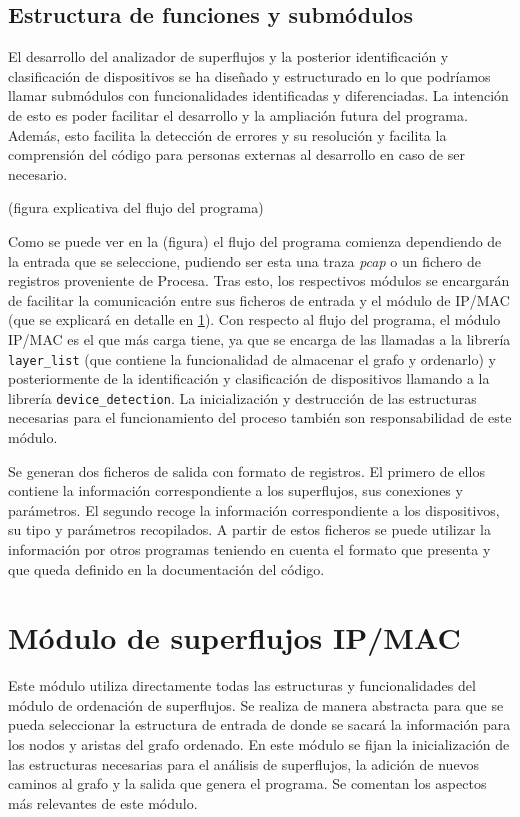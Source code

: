 \documentclass[twoside, 12pt]{epstfg}
\begin{document}
\subsection{Estructura de funciones y submódulos}
\label{subsec:Desarrollo:Ordenacion:EstructuraFunciones}
El desarrollo del analizador de superflujos y la posterior identificación y clasificación de dispositivos se ha diseñado y estructurado en lo que podríamos llamar submódulos con funcionalidades identificadas y diferenciadas. La intención de esto es poder facilitar el desarrollo y la ampliación futura del programa. Además, esto facilita la detección de errores y su resolución y facilita la comprensión del código para personas externas al desarrollo en caso de ser necesario.

(figura explicativa del flujo del programa)

Como se puede ver en la (figura) el flujo del programa comienza dependiendo de la entrada que se seleccione, pudiendo ser esta una traza \textit{pcap} o un fichero de registros proveniente de Procesa. Tras esto, los respectivos módulos se encargarán de facilitar la comunicación entre sus ficheros de entrada y el módulo de IP/MAC (que se explicará en detalle en \ref{sec:Desarrollo:IPMAC}). Con respecto al flujo del programa, el módulo IP/MAC es el que más carga tiene, ya que se encarga de las llamadas a la librería \texttt{layer\_list} (que contiene la funcionalidad de almacenar el grafo y ordenarlo) y posteriormente de la identificación y clasificación de dispositivos llamando a la librería \texttt{device\_detection}. La inicialización y destrucción de las estructuras necesarias para el funcionamiento del proceso también son responsabilidad de este módulo.

Se generan dos ficheros de salida con formato de registros. El primero de ellos contiene la información correspondiente a los superflujos, sus conexiones y parámetros. El segundo recoge la información correspondiente a los dispositivos, su tipo y parámetros recopilados. A partir de estos ficheros se puede utilizar la información por otros programas teniendo en cuenta el formato que presenta y que queda definido en la documentación del código.

\section{Módulo de superflujos IP/MAC}
\label{sec:Desarrollo:IPMAC}
Este módulo utiliza directamente todas las estructuras y funcionalidades del módulo de ordenación de superflujos. Se realiza de manera abstracta para que se pueda seleccionar la estructura de entrada de donde se sacará la información para los nodos y aristas del grafo ordenado. En este módulo se fijan la inicialización de las estructuras necesarias para el análisis de superflujos, la adición de nuevos caminos al grafo y la salida que genera el programa. Se comentan los aspectos más relevantes de este módulo.
\end{document}
